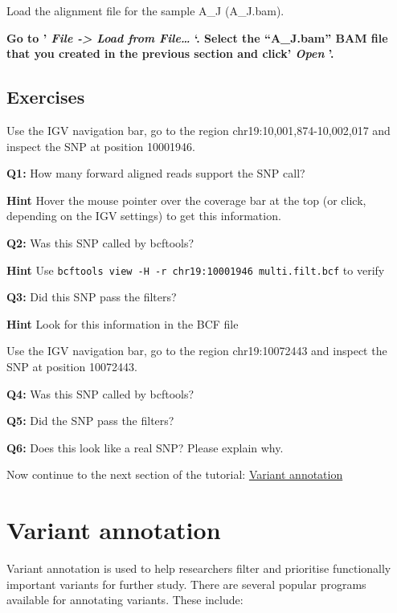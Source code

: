 \documentclass[11pt]{article}
\begin{document}
Load the alignment file for the sample A\_J (A\_J.bam).

\textbf{Go to ' \textit{File -\textgreater{} Load from File\ldots{}} `.
Select the ``A\_J.bam'' BAM file that you created in the previous
section and click' \textit{Open} '.}

    \hypertarget{exercises}{%
\subsection{Exercises}\label{exercises}}

Use the IGV navigation bar, go to the region chr19:10,001,874-10,002,017
and inspect the SNP at position 10001946.

\textbf{Q1:} How many forward aligned reads support the SNP call?

\textbf{Hint} Hover the mouse pointer over the coverage bar at the top
(or click, depending on the IGV settings) to get this information.

\textbf{Q2:} Was this SNP called by bcftools?

\textbf{Hint} Use
\texttt{bcftools\ view\ -H\ -r\ chr19:10001946\ multi.filt.bcf} to
verify

\textbf{Q3:} Did this SNP pass the filters?

\textbf{Hint} Look for this information in the BCF file

Use the IGV navigation bar, go to the region chr19:10072443 and inspect
the SNP at position 10072443.

\textbf{Q4:} Was this SNP called by bcftools?

\textbf{Q5:} Did the SNP pass the filters?

\textbf{Q6:} Does this look like a real SNP? Please explain why.

    Now continue to the next section of the tutorial:
\href{annotation.ipynb}{Variant annotation}





\newpage





    \hypertarget{variant-annotation}{%
\section{Variant annotation}\label{variant-annotation}}

Variant annotation is used to help researchers filter and prioritise
functionally important variants for further study. There are several
popular programs available for annotating variants. These include:
\end{document}
